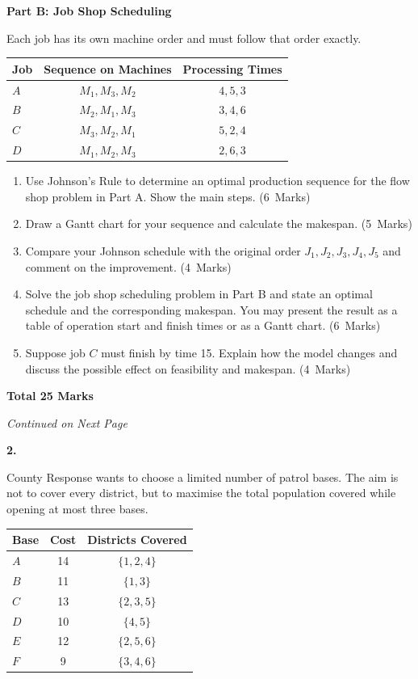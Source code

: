 \documentclass[11pt,a4paper]{article}
\newcommand{\continuednotice}{%
    \vfill
    \begin{center}
    \textit{Continued on Next Page}
    \end{center}
    \newpage
}
\newcommand{\markalloc}[1]{\nobreak\hfill\mbox{(#1 Marks)}}
\newcommand{\questiontotal}[1]{\begin{flushright}\textbf{Total #1 Marks}\end{flushright}}
\begin{document}
\textbf{Part B: Job Shop Scheduling}

Each job has its own machine order and must follow that order exactly.

\begin{center}
\begin{tabular}{lcc}
\toprule
Job & Sequence on Machines & Processing Times \\
\midrule
$A$ & $M_1, M_3, M_2$ & $4, 5, 3$ \\
$B$ & $M_2, M_1, M_3$ & $3, 4, 6$ \\
$C$ & $M_3, M_2, M_1$ & $5, 2, 4$ \\
$D$ & $M_1, M_2, M_3$ & $2, 6, 3$ \\
\bottomrule
\end{tabular}
\end{center}

\begin{enumerate}
\item Use Johnson's Rule to determine an optimal production sequence for the flow shop problem in Part A. Show the main steps. \markalloc{6}

\item Draw a Gantt chart for your sequence and calculate the makespan. \markalloc{5}

\item Compare your Johnson schedule with the original order $J_1,J_2,J_3,J_4,J_5$ and comment on the improvement. \markalloc{4}

\item Solve the job shop scheduling problem in Part B and state an optimal schedule and the corresponding makespan. You may present the result as a table of operation start and finish times or as a Gantt chart. \markalloc{6}

\item Suppose job $C$ must finish by time 15. Explain how the model changes and discuss the possible effect on feasibility and makespan. \markalloc{4}
\end{enumerate}

\questiontotal{25}

\continuednotice

\textbf{2.}

County Response wants to choose a limited number of patrol bases.
The aim is not to cover every district, but to maximise the total population covered while opening at most three bases.

\begin{center}
\begin{tabular}{lcc}
\toprule
Base & Cost & Districts Covered \\
\midrule
$A$ & 14 & $\{1,2,4\}$ \\
$B$ & 11 & $\{1,3\}$ \\
$C$ & 13 & $\{2,3,5\}$ \\
$D$ & 10 & $\{4,5\}$ \\
$E$ & 12 & $\{2,5,6\}$ \\
$F$ & 9  & $\{3,4,6\}$ \\
\bottomrule
\end{tabular}
\end{center}
\end{document}
